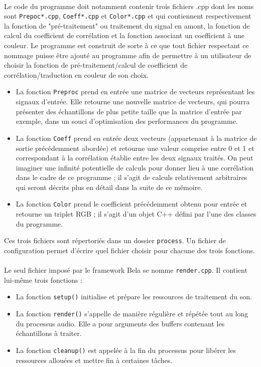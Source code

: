 \paragraph{}
Le code du programme doit notamment contenir trois fichiers .cpp dont
les noms sont \verb!Prepoc*.cpp!, \verb!Coeff*.cpp! et
\verb!Color*.cpp! et qui contiennent respectivement la fonction de
"pré-traitement" ou traitement du signal en amont, la fonction de
calcul du coefficient de corrélation et la fonction associant un
coefficient à une couleur. Le programme est construit de sorte à ce
que tout fichier respectant ce nommage puisse être ajouté au programme
afin de permettre à un utilisateur de choisir la fonction de
pré-traitement/calcul de coefficient de
corrélation/traduction en couleur de son choix.
\begin{itemize}
	\item La fonction \verb!Preproc! prend en entrée une matrice de
	      vecteurs représentant les signaux d'entrée. Elle retourne une
	      nouvelle matrice de vecteurs, qui pourra présenter des
	      échantillons de plus petite taille que la matrice d'entrée par
	      exemple, dans un souci d'optimisation des performances du
	      programme.
	\item La fonction \verb!Coeff! prend en entrée deux vecteurs
	      (appartenant à la matrice de sortie précédemment abordée) et
	      retourne une valeur comprise entre 0 et 1 et correspondant à la
	      corrélation établie entre les deux signaux traités. On peut
	      imaginer une infinité potentielle de calculs pour donner lieu à
	      une corrélation dans le cadre de ce programme ; il s'agit de
	      calculs relativement arbitraires qui seront décrits plus en détail
	      dans la suite de ce mémoire.
	\item La fonction \verb!Color! prend le coefficient précédemment obtenu
	      pour entrée et retourne un triplet RGB ; il s'agit d'un objet C++
	      défini par l'une des classes du programme.
\end{itemize}
Ces trois fichiers sont répertoriés dans un dossier \verb!process!. Un
fichier de configuration permet d'écrire quel fichier choisir pour
chacune des trois fonctions.

\paragraph{}
Le seul fichier imposé par le framework Bela se nomme \verb!render.cpp!. Il
contient lui-même trois fonctions :
\begin{itemize}
	\item La fonction \verb!setup()! initialise et prépare les ressources de
	      traitement du son.
	\item La fonction \verb!render()! s'appelle de manière régulière et répétée
	      tout au long du processus audio. Elle a pour arguments des buffers
	      contenant les échantillons à traiter.
	\item La fonction \verb!cleanup()! est appelée à la fin du processus pour
	      libérer les ressources allouées et mettre fin à certaines tâches.
\end{itemize}

